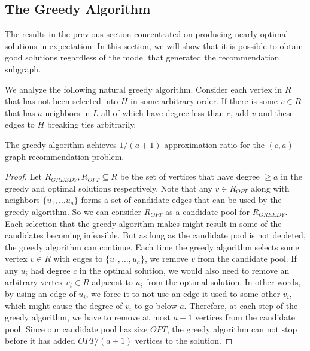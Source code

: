 \subsection{The Greedy Algorithm}
\label{greedy}
The results in the previous section concentrated on producing nearly
optimal solutions in expectation. In this section, we will show that
it is possible to obtain good solutions regardless of the model that
generated the recommendation subgraph. \vs

We analyze the following
natural greedy algorithm. Consider each vertex in $R$ that has not been selected
into $H$ in some arbitrary order. If there is some $v \in R$ that has $a$ neighbors
in $L$ all of which have degree less than $c$, add $v$ and these edges to $H$ breaking
ties arbitrarily.

\begin{thm}
The greedy algorithm achieves $1/(a+1)$-approximation ratio for the $(c,a)$-graph
recommendation problem.
\end{thm}
\begin{proof}
Let $R_{GREEDY}, R_{OPT}\subseteq R$ be the set of vertices that have
degree $\geq a$ in the greedy and optimal solutions respectively. Note
that any $v \in R_{OPT}$ along with neighbors $\{u_1,\ldots u_a\}$
forms a set of candidate edges that can be used by the greedy
algorithm. So we can consider $R_{OPT}$ as a candidate pool for
$R_{GREEDY}$. Each selection that the greedy algorithm makes might result in
some of the candidates becoming infeasible. But as long as the candidate pool
is not depleted, the greedy algorithm can continue. 
Each time the greedy algorithm selects some vertex $v\in
R$ with edges to $\{u_1,\ldots, u_a\}$, we remove $v$ from the candidate pool. 
If any $u_i$ had degree $c$ in the optimal solution, we would also need to
remove an arbitrary vertex $v_i\in R$ adjacent to $u_i$ from the optimal
solution. In other words, by using an edge of $u_i$, we force it to
not use an edge it used to some other $v_i$, which might cause the
degree of $v_i$ to go below $a$. Therefore, at each step of
the greedy algorithm, we have to remove at most $a+1$ vertices from
the candidate pool. Since our candidate pool has size $OPT$, the
greedy algorithm can not stop before it has added $OPT/(a+1)$
vertices to the solution.
\end{proof}

